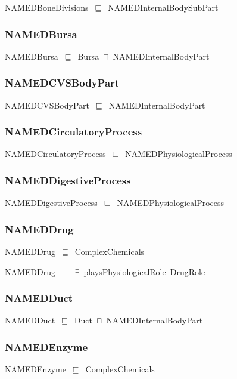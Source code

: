 \documentclass{article}
\begin{document}
NAMEDBoneDivisions~\ensuremath{\sqsubseteq}~NAMEDInternalBodySubPart~

\subsubsection*{NAMEDBursa}

NAMEDBursa~\ensuremath{\sqsubseteq}~Bursa~\ensuremath{\sqcap}~NAMEDInternalBodyPart~

\subsubsection*{NAMEDCVSBodyPart}

NAMEDCVSBodyPart~\ensuremath{\sqsubseteq}~NAMEDInternalBodyPart~

\subsubsection*{NAMEDCirculatoryProcess}

NAMEDCirculatoryProcess~\ensuremath{\sqsubseteq}~NAMEDPhysiologicalProcess~

\subsubsection*{NAMEDDigestiveProcess}

NAMEDDigestiveProcess~\ensuremath{\sqsubseteq}~NAMEDPhysiologicalProcess~

\subsubsection*{NAMEDDrug}

NAMEDDrug~\ensuremath{\sqsubseteq}~ComplexChemicals~

NAMEDDrug~\ensuremath{\sqsubseteq}~\ensuremath{\exists}~playsPhysiologicalRole~DrugRole~

\subsubsection*{NAMEDDuct}

NAMEDDuct~\ensuremath{\sqsubseteq}~Duct~\ensuremath{\sqcap}~NAMEDInternalBodyPart~

\subsubsection*{NAMEDEnzyme}

NAMEDEnzyme~\ensuremath{\sqsubseteq}~ComplexChemicals~
\end{document}
